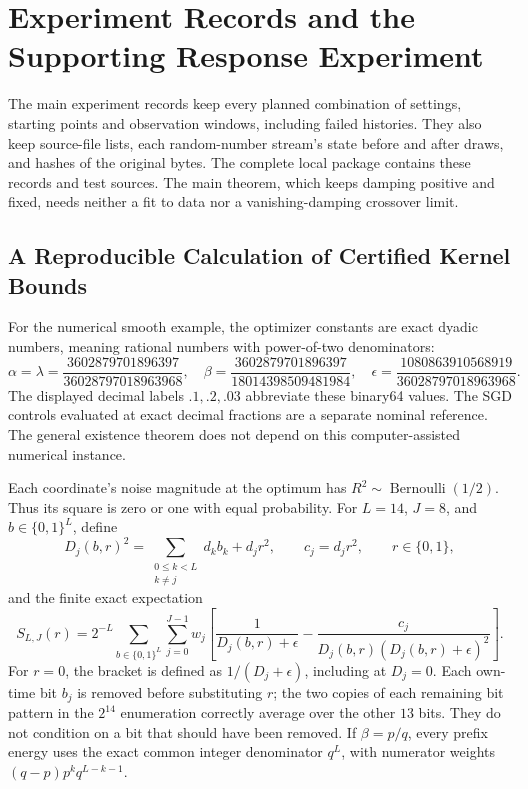\section{Experiment Records and the Supporting Response Experiment}
\label{app:empirical}

The main experiment records keep every planned combination of settings,
starting points and observation windows, including failed histories. They
also keep source-file lists, each random-number stream's state before and
after draws, and hashes of the original bytes. The complete local package
contains these records and test sources. The main theorem, which keeps
damping positive and fixed, needs neither a fit to data nor a
vanishing-damping crossover limit.

\subsection{A Reproducible Calculation of Certified Kernel Bounds}\label{app:certificate}
For the numerical smooth example, the optimizer constants are exact
dyadic numbers, meaning rational numbers with power-of-two denominators:
\[
 \alpha=\lambda=\frac{3602879701896397}{36028797018963968},\quad
 \beta=\frac{3602879701896397}{18014398509481984},\quad
 \epsilon=\frac{1080863910568919}{36028797018963968}.
\]
The displayed decimal labels $.1,.2,.03$ abbreviate these binary64 values.
The SGD controls evaluated at exact decimal fractions are a separate
nominal reference.
The general existence theorem does not depend on this computer-assisted
numerical instance.

Each coordinate's noise magnitude at the optimum has $R^2\sim\operatorname{Bernoulli}(1/2)$.
Thus its square is zero or one with equal probability. For $L=14$,
$J=8$, and $b\in\{0,1\}^L$, define
\[
 D_j(b,r)^2=\sum_{\substack{0\leq k<L\\k\ne j}}d_kb_k+d_jr^2,
 \qquad c_j=d_jr^2,\qquad r\in\{0,1\},
\]
and the finite exact expectation
\[
 S_{L,J}(r)=2^{-L}\sum_{b\in\{0,1\}^L}\sum_{j=0}^{J-1}w_j
 \left[\frac1{D_j(b,r)+\epsilon}
       -\frac{c_j}{D_j(b,r)(D_j(b,r)+\epsilon)^2}\right].
\]
For $r=0$, the bracket is defined as $1/(D_j+\epsilon)$, including
at $D_j=0$. Each own-time bit $b_j$ is removed before substituting $r$;
the two copies of each remaining bit pattern in the $2^{14}$ enumeration
correctly average over the other $13$ bits. They do not condition on a
bit that should have been removed.
If $\beta=p/q$, every prefix energy uses the exact common integer denominator
$q^L$, with numerator weights $(q-p)p^kq^{L-k-1}$.


